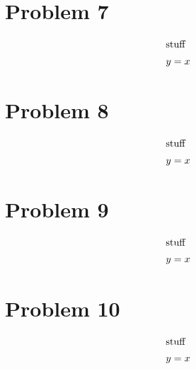 \documentclass[12pt]{article}
\begin{document}
\section*{Problem 7}

\begin{align} 
    \intertext{stuff}
    y&=x
\end{align}


\section*{Problem 8}

\begin{align} 
    \intertext{stuff}
    y&=x
\end{align}



\section*{Problem 9}

\begin{align} 
    \intertext{stuff}
    y&=x
\end{align}


\section*{Problem 10}

\begin{align} 
    \intertext{stuff}
    y&=x
\end{align}
\end{document}

